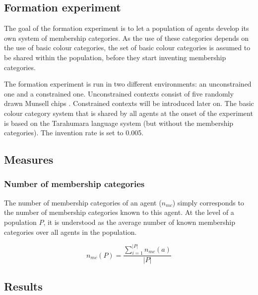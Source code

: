 \subsection{Formation experiment}

The goal of the formation experiment is to let a population of agents
develop its own system of membership categories. As the use of these
categories depends on the use of basic colour categories, the set
of basic colour categories is assumed to be shared within the
population, before they start inventing membership categories. 

The formation experiment is run in two different environments: an
unconstrained one and a constrained one. Unconstrained contexts consist of
five randomly drawn Munsell chips \citep{newhall42final}. Constrained
contexts will be introduced later on. The basic colour
category system that is shared by all agents at the onset of the
experiment is based on the Tarahumara language system (but without the
membership categories). The invention rate is set to 0.005.

\subsection{Measures}

\subsubsection{Number of membership categories}


The number of membership categories of an agent ($n_{mc}$) simply
corresponds to the number of membership categories known to this
agent. At the level of a population $P$, it is understood as the
average number of known membership categories over all agents in the
population.

\begin{equation}
n_{mc}(P) = \frac{\displaystyle \sum_{i=1}^{|P|} n_{mc}(a)}{|P|}
\label{eq:number-of-membership-categories-population}
\end{equation}

\subsection{Results}

